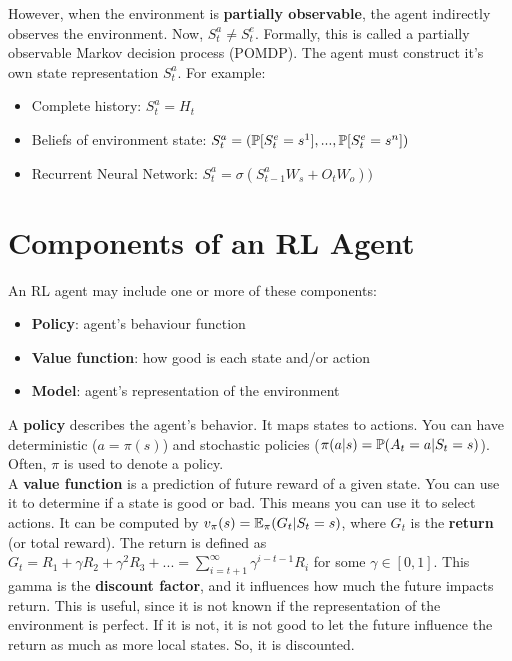 However, when the environment is \textbf{partially observable}, the agent indirectly observes the environment. Now, $S_t^a \neq S_t^e$. Formally, this is called a partially observable Markov decision process (POMDP). The agent must construct it's own state representation $S_t^a$. For example:

\begin{itemize}
	\item Complete history: $S_t^a = H_t$
	\item Beliefs of environment state: $S_t^a = (\operatorname{\mathbb{P}}[S_t^e = s^1], ...,\operatorname{\mathbb{P}}[S_t^e = s^n])$
	\item Recurrent Neural Network: $S_t^a = \sigma(S_{t-1}^a W_s + O_t W_o))$
\end{itemize}

\section{Components of an RL Agent}

An RL agent may include one or more of these components:
\begin{itemize}
	\item \textbf{Policy}: agent's behaviour function
	\item \textbf{Value function}: how good is each state and/or action
	\item \textbf{Model}: agent's representation of the environment
\end{itemize}

A \textbf{policy} describes the agent's behavior. It maps states to actions. You can have deterministic ($a = \pi(s)$) and stochastic policies ($\pi(a | s) = \operatorname{\mathbb{P}}(A_t = a | S_t = s)$). Often, $\pi$ is used to denote a policy.\\

A \textbf{value function} is a prediction of future reward of a given state. You can use it to determine if a state is good or bad. This means you can use it to select actions. It can be computed by $v_\pi(s) = \operatorname{\mathbb{E}}_\pi(G_t | S_t = s)$, where $G_t$ is the \textbf{return} (or total reward). The return is defined as $G_t = R_1 + \gamma R_2 + \gamma^2 R_3 + ... = \sum_{i=t+1}^\infty\gamma^{i-t-1}R_i$ for some $\gamma \in [0, 1]$. This gamma is the \textbf{discount factor}, and it influences how much the future impacts return. This is useful, since it is not known if the representation of the environment is perfect. If it is not, it is not good to let the future influence the return as much as more local states. So, it is discounted.\\

